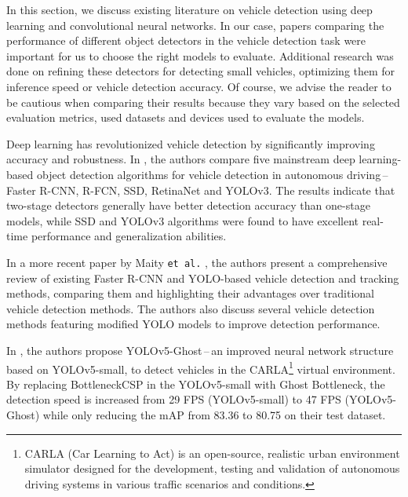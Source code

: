 In this section, we discuss existing literature on vehicle detection using deep
learning and convolutional neural networks. In our case, papers comparing the
performance of different object detectors in the vehicle detection task were
important for us to choose the right models to evaluate. Additional research was
done on refining these detectors for detecting small vehicles, optimizing them
for inference speed or vehicle detection accuracy. Of course, we advise the
reader to be cautious when comparing their results because they vary based on
the selected evaluation metrics, used datasets and devices used to evaluate the
models.

Deep learning has revolutionized vehicle detection by significantly improving
accuracy and robustness. In \cite{Wang2019}, the authors compare five mainstream
deep learning-based object detection algorithms for vehicle detection in
autonomous driving\,--\,Faster R-CNN, R-FCN, SSD, RetinaNet and YOLOv3. The
results indicate that two-stage detectors generally have better detection
accuracy than one-stage models, while SSD and YOLOv3 algorithms were found to
have excellent real-time performance and generalization abilities. 

In a more recent paper by Maity \texttt{et al.} \cite{Maity2021},
the authors present a comprehensive review of existing Faster R-CNN and
YOLO-based vehicle detection and tracking methods, comparing them and
highlighting their advantages over traditional vehicle detection methods. The
authors also discuss several vehicle detection methods featuring modified YOLO
models to improve detection performance.

In \cite{Wu2021}, the authors propose YOLOv5-Ghost\,--\,an improved neural
network structure based on YOLOv5-small, to detect vehicles in the
CARLA\footnote{CARLA (Car Learning to Act) is an open-source, realistic urban
environment simulator designed for the development, testing and validation of
autonomous driving systems in various traffic scenarios and conditions.} virtual
environment. By replacing BottleneckCSP in the YOLOv5-small with Ghost
Bottleneck, the detection speed is increased from 29 FPS (YOLOv5-small) to 47
FPS (YOLOv5-Ghost) while only reducing the mAP from \num{83.36} to \num{80.75}
on their test dataset.














